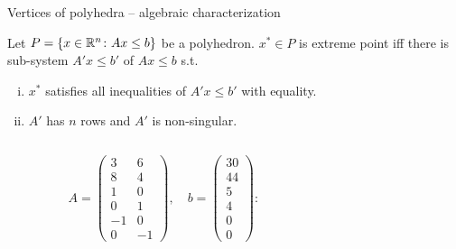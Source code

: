 \begin{frame}{Vertices of polyhedra -- algebraic characterization}

\begin{theorem}
  \label{thr:1}
  Let $P = \{x \in \mathbb{R}^n \colon Ax \leq b\}$ be a polyhedron. $x^* ∈ P$ is  extreme point iff  there is  sub-system $A'x \leq b'$ of  $Ax \leq b$  s.t. 
  \begin{enumerate}[i)]
  \item $x^*$ satisfies all inequalities of $A'x \leq b'$ with
    equality. \label{item:1}
  \item $A'$ has $n$ rows and $A'$ is non-singular. \label{item:2}
  \end{enumerate}  
\end{theorem}
{\small 
\begin{columns}
    \begin{column}{.5\textwidth}     
    \begin{displaymath}
      A =
      \begin{pmatrix}
        3 & 6 \\
        8 & 4 \\
        1 & 0 \\
        0 & 1 \\
        -1 & 0 \\
        0 & -1
      \end{pmatrix},
    \quad b = 
      \begin{pmatrix}
        30 \\ 44 \\ 5 \\ 4 \\ 0 \\ 0
      \end{pmatrix}:
    \end{displaymath}
 
    \end{column}
    \begin{column}{.5\textwidth}
      
\end{column}
\end{columns}}
\end{frame}
